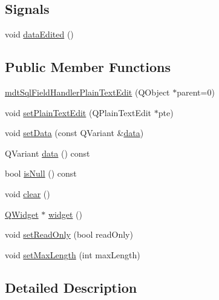 \subsection*{Signals}
\begin{DoxyCompactItemize}
\item 
void \hyperlink{classmdt_sql_field_handler_plain_text_edit_a02bf9771831503a431b9b778aec58355}{data\-Edited} ()
\end{DoxyCompactItemize}
\subsection*{Public Member Functions}
\begin{DoxyCompactItemize}
\item 
\hyperlink{classmdt_sql_field_handler_plain_text_edit_a00cf7ab085c8487093e66f14185bdb06}{mdt\-Sql\-Field\-Handler\-Plain\-Text\-Edit} (Q\-Object $\ast$parent=0)
\item 
void \hyperlink{classmdt_sql_field_handler_plain_text_edit_a9120d400213499850d990a7948464f6f}{set\-Plain\-Text\-Edit} (Q\-Plain\-Text\-Edit $\ast$pte)
\item 
void \hyperlink{classmdt_sql_field_handler_plain_text_edit_a4294af57a366f4798e897607174729ed}{set\-Data} (const Q\-Variant \&\hyperlink{classmdt_sql_field_handler_plain_text_edit_ad205b35b03c91658d928b2d903348a5d}{data})
\item 
Q\-Variant \hyperlink{classmdt_sql_field_handler_plain_text_edit_ad205b35b03c91658d928b2d903348a5d}{data} () const 
\item 
bool \hyperlink{classmdt_sql_field_handler_plain_text_edit_acee5d7ee57d9ea520bf70bdfe6a211f4}{is\-Null} () const 
\item 
void \hyperlink{classmdt_sql_field_handler_plain_text_edit_ac6b23b2e59967ab56dc6299dc76f6230}{clear} ()
\item 
\hyperlink{class_q_widget}{Q\-Widget} $\ast$ \hyperlink{classmdt_sql_field_handler_plain_text_edit_a6faa79f2e738582474493151aa0af886}{widget} ()
\item 
void \hyperlink{classmdt_sql_field_handler_plain_text_edit_a415de00cefa204ec7015a33e35e147e2}{set\-Read\-Only} (bool read\-Only)
\item 
void \hyperlink{classmdt_sql_field_handler_plain_text_edit_ab0e14b4df6ebd5aa5140dc44540517c6}{set\-Max\-Length} (int max\-Length)
\end{DoxyCompactItemize}


\subsection{Detailed Description}


